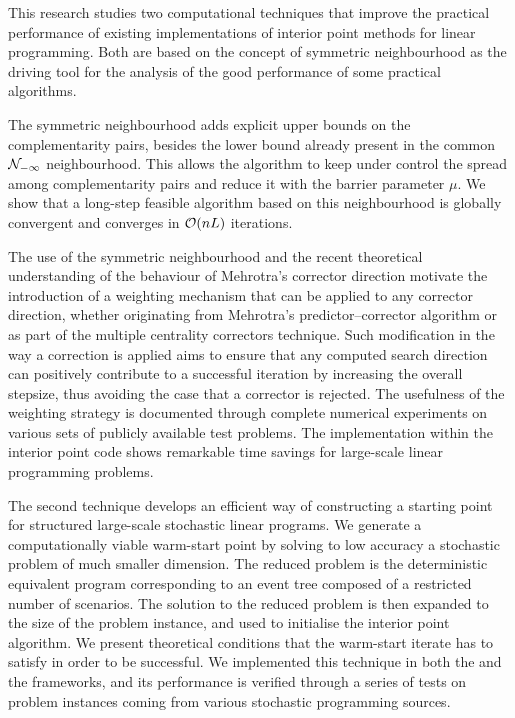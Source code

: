 
%
%

This research studies two computational techniques that improve
the practical performance of existing implementations 
of interior point methods for linear programming.
Both are based on the concept of symmetric neighbourhood 
as the driving tool for the analysis of the good 
performance of some practical algorithms. 

The symmetric neighbourhood adds explicit upper bounds
on the complementarity pairs, besides the lower bound already
present in the common $\mathcal{N}_{-\infty}$ neighbourhood.
This allows the algorithm to keep under control the spread among 
complementarity pairs and reduce it with the barrier parameter $\mu$.
We show that a long-step feasible algorithm based on 
this neighbourhood is globally convergent and
converges in $\mathcal{O}(nL)$ iterations.

The use of the symmetric neighbourhood and the recent
theoretical understanding of the behaviour of Mehrotra's
corrector direction motivate the introduction of a weighting
mechanism that can be applied to any corrector direction,
whether originating from Mehrotra's predictor--corrector algorithm
or as part of the multiple centrality correctors technique.
Such modification in the way a correction is applied
aims to ensure that any computed search direction can positively
contribute to a successful iteration by increasing the overall
stepsize, thus avoiding the case that a corrector is rejected.
The usefulness of the weighting strategy is documented through
complete numerical experiments on various sets of publicly
available test problems.
The implementation within the \HOPDM interior point code
shows remarkable time savings for large-scale linear programming problems.

The second technique develops an efficient way of 
constructing a starting point for structured large-scale 
stochastic linear programs.
We generate a computationally viable warm-start point by solving 
to low accuracy a stochastic problem of much smaller dimension.
The reduced problem is the deterministic equivalent program
corresponding to an event tree composed of a restricted number
of scenarios.
The solution to the reduced problem is then expanded to the
size of the problem instance, and used to initialise the
interior point algorithm.
We present theoretical conditions that the warm-start iterate
has to satisfy in order to be successful.
We implemented this technique in both the \HOPDM and the \OOPS
frameworks, and its performance is verified through 
a series of tests on problem instances coming from various stochastic
programming sources.
